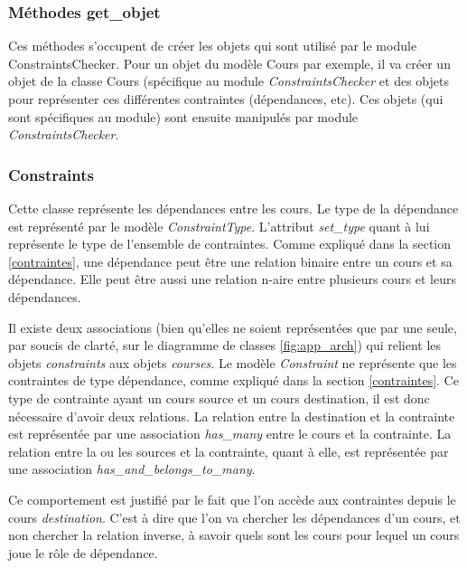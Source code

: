\subsubsection{Méthodes get\_objet}
Ces méthodes s'occupent de créer les objets qui sont utilisé par le module ConstraintsChecker. Pour un objet du modèle Cours par exemple, il va créer un objet de la classe Cours (spécifique au module \textit{ConstraintsChecker} et des objets pour représenter ces différentes contraintes (dépendances, etc). Ces objets (qui sont spécifiques au module) sont ensuite manipulés par module \textit{ConstraintsChecker}.

\subsubsection{Constraints}
Cette classe représente les dépendances entre les cours. Le type de la dépendance est représenté par le modèle \textit{ConstraintType}. L'attribut \textit{set\_type} quant à lui représente le type de l'ensemble de contraintes. Comme expliqué dans la section \ref{contraintes}, une dépendance peut être une relation binaire entre un cours et sa dépendance. Elle peut être aussi une relation n-aire entre plusieurs cours et leurs dépendances.

Il existe deux associations (bien qu'elles ne soient représentées que par une seule, par soucis de clarté, sur le diagramme de classes \ref{fig:app_arch}) qui relient les objets \textit{constraints} aux objets \textit{courses}. Le modèle \textit{Constraint} ne représente que les contraintes de type dépendance, comme expliqué dans la section \ref{contraintes}. Ce type de contrainte ayant un cours source et un cours destination, il est donc nécessaire d'avoir deux relations.  La relation entre la destination et la contrainte est représentée par une association \textit{has\_many} entre le cours et la contrainte. La relation entre la ou les sources et la contrainte, quant à elle, est représentée par une association \textit{has\_and\_belongs\_to\_many}. 

Ce comportement est justifié par le fait que l'on accède aux contraintes depuis le cours \textit{destination}. C'est à dire que l'on va chercher les dépendances d'un cours, et non chercher la relation inverse, à savoir quels sont les cours pour lequel un cours joue le rôle de dépendance.

